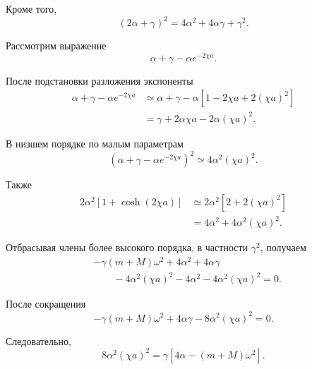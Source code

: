 \documentclass[../final.tex]{subfiles}
\begin{document}
Кроме того,
%
\begin{equation*}
    (2\alpha+\gamma)^2
    =
    4\alpha^2
    +
    4\alpha\gamma
    +
    \gamma^2.
\end{equation*}
%

Рассмотрим выражение
%
\begin{equation*}
    \alpha+\gamma-\alpha e^{-2\chi a}.
\end{equation*}
%

После подстановки разложения экспоненты
%
\begin{align*}
    \alpha+\gamma-\alpha e^{-2\chi a}
    &\simeq
    \alpha+\gamma
    -
    \alpha
    \left[
        1-2\chi a+2(\chi a)^2
    \right]
    \\
    &=
    \gamma
    +
    2\alpha\chi a
    -
    2\alpha(\chi a)^2.
\end{align*}
%

В низшем порядке по малым параметрам
%
\begin{equation*}
    \left(
        \alpha+\gamma-\alpha e^{-2\chi a}
    \right)^2
    \simeq
    4\alpha^2(\chi a)^2.
\end{equation*}
%

Также
%
\begin{align*}
    2\alpha^2
    \left[
        1+\cosh(2\chi a)
    \right]
    &\simeq
    2\alpha^2
    \left[
        2+2(\chi a)^2
    \right]
    \\
    &=
    4\alpha^2
    +
    4\alpha^2(\chi a)^2.
\end{align*}
%

Отбрасывая члены более высокого порядка,
в частности $\gamma^2$,
получаем
%
\begin{align*}
    &
    -\gamma(m+M)\omega^2
    +
    4\alpha^2
    +
    4\alpha\gamma
    \\
    &\qquad
    -
    4\alpha^2(\chi a)^2
    -
    4\alpha^2
    -
    4\alpha^2(\chi a)^2
    =
    0.
\end{align*}
%

После сокращения
%
\begin{equation*}
    -\gamma(m+M)\omega^2
    +
    4\alpha\gamma
    -
    8\alpha^2(\chi a)^2
    =
    0.
\end{equation*}
%

Следовательно,
%
\begin{equation*}
    8\alpha^2(\chi a)^2
    =
    \gamma
    \left[
        4\alpha
        -
        (m+M)\omega^2
    \right].
\end{equation*}
\end{document}
